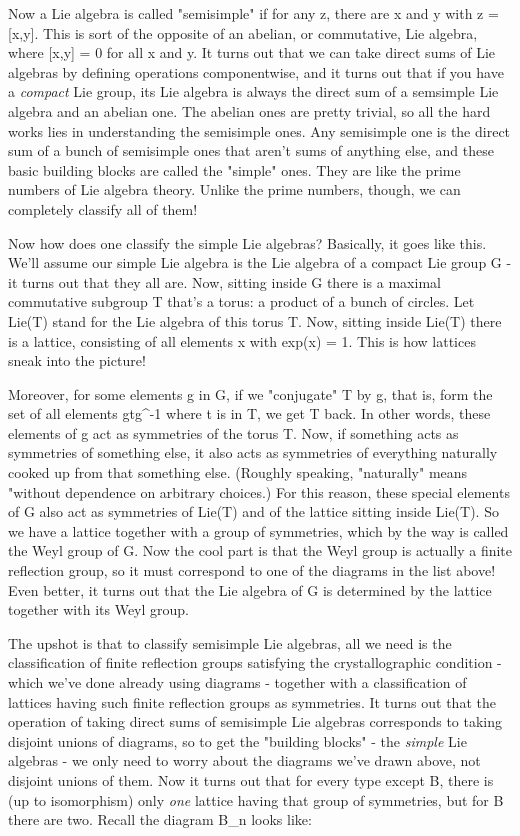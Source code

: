 Now a Lie algebra is called "semisimple" if for any z, there
are x and y with z = [x,y].  This is sort of the opposite of an
abelian, or commutative, Lie algebra, where [x,y] = 0 for all x and y.
It turns out that we can take direct sums of Lie algebras by defining
operations componentwise, and it turns out that if you have a
\emph{compact} Lie group, its Lie algebra is always the direct sum
of a semsimple Lie algebra and an abelian one.  The abelian ones are
pretty trivial, so all the hard works lies in understanding the
semisimple ones.  Any semisimple one is the direct sum of a bunch of
semisimple ones that aren't sums of anything else, and these basic
building blocks are called the "simple" ones.  They are like
the prime numbers of Lie algebra theory.  Unlike the prime numbers,
though, we can completely classify all of them!

Now how does one classify the simple Lie algebras?  Basically, it goes
like this.  We'll assume our simple Lie algebra is the Lie algebra of a
compact Lie group G - it turns out that they all are.  Now, sitting
inside G there is a maximal commutative subgroup T that's a torus: a
product of a bunch of circles.  Let Lie(T) stand for the Lie algebra of
this torus T.  Now, sitting inside Lie(T) there is a lattice, consisting
of all elements x with exp(x) = 1.  This is how lattices sneak into the
picture!

Moreover, for some elements g in G, if we "conjugate" T by
g, that is, form the set of all elements gtg^{-1} where t is
in T, we get T back.  In other words, these elements of g act as
symmetries of the torus T.  Now, if something acts as symmetries of
something else, it also acts as symmetries of everything naturally
cooked up from that something else.  (Roughly speaking,
"naturally" means "without dependence on arbitrary
choices.)  For this reason, these special elements of G also act as
symmetries of Lie(T) and of the lattice sitting inside Lie(T).  So we
have a lattice together with a group of symmetries, which by the way
is called the Weyl group of G.  Now the cool part is that the Weyl
group is actually a finite reflection group, so it must correspond to
one of the diagrams in the list above!  Even better, it turns out that
the Lie algebra of G is determined by the lattice together with its
Weyl group.

The upshot is that to classify semisimple Lie algebras, all we need is
the classification of finite reflection groups satisfying the
crystallographic condition - which we've done already using diagrams
- together with a classification of lattices having such finite
reflection groups as symmetries.  It turns out that the operation of
taking direct sums of semisimple Lie algebras corresponds to taking
disjoint unions of diagrams, so to get the "building blocks" - the
\emph{simple} Lie algebras - we only need to worry about the diagrams we've
drawn above, not disjoint unions of them.  Now it turns out that for
every type except B, there is (up to isomorphism) only \emph{one} lattice
having that group of symmetries, but for B there are two.  Recall the
diagram B_{n} looks like:


